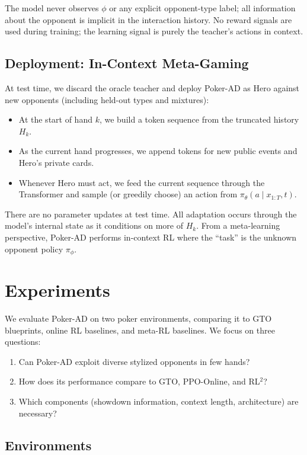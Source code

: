 \documentclass{article}
\begin{document}
The model never observes $\phi$ or any explicit opponent-type label; all information about the opponent is implicit in the interaction history. No reward signals are used during training; the learning signal is purely the teacher's actions in context.

\subsection{Deployment: In-Context Meta-Gaming}
\label{sec:deployment}

At test time, we discard the oracle teacher and deploy Poker-AD as Hero against new opponents (including held-out types and mixtures):
\begin{itemize}[leftmargin=*]
    \item At the start of hand $k$, we build a token sequence from the truncated history $H_k$.
    \item As the current hand progresses, we append tokens for new public events and Hero's private cards.
    \item Whenever Hero must act, we feed the current sequence through the Transformer and sample (or greedily choose) an action from $\pi_{\theta}(a \mid x_{1:T}, t)$.
\end{itemize}

There are no parameter updates at test time. All adaptation occurs through the model's internal state as it conditions on more of $H_k$. From a meta-learning perspective, Poker-AD performs in-context RL where the ``task'' is the unknown opponent policy $\pi_{\phi}$.

\section{Experiments}
\label{sec:experiments}

We evaluate Poker-AD on two poker environments, comparing it to GTO blueprints, online RL baselines, and meta-RL baselines. We focus on three questions:
\begin{enumerate}[leftmargin=*]
    \item Can Poker-AD exploit diverse stylized opponents in few hands?
    \item How does its performance compare to GTO, PPO-Online, and RL$^2$?
    \item Which components (showdown information, context length, architecture) are necessary?
\end{enumerate}

\subsection{Environments}
\label{sec:envs}
\end{document}
